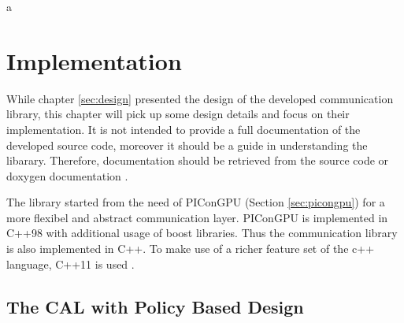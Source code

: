a\chapter{Implementation}
\label{sec:implementation}



While chapter \ref{sec:design} presented the design of the developed
communication library, this chapter will pick up some design details
and focus on their implementation.  It is not intended to provide a
full documentation of the developed source code, moreover it should be
a guide in understanding the libarary. Therefore, documentation should
be retrieved from the source code or doxygen documentation
\cite{ref:doxygen}.

The library started from the need of PIConGPU (Section
\ref{sec:picongpu}) for a more flexibel and abstract communication
layer. PIConGPU is implemented in C++98 with additional usage of boost
\cite{ref:boost} libraries. Thus the communication library is also
implemented in C++. To make use of a richer feature set of the c++
language, C++11 is used \cite{ref:c++11}.

\section{The CAL with Policy Based Design}

